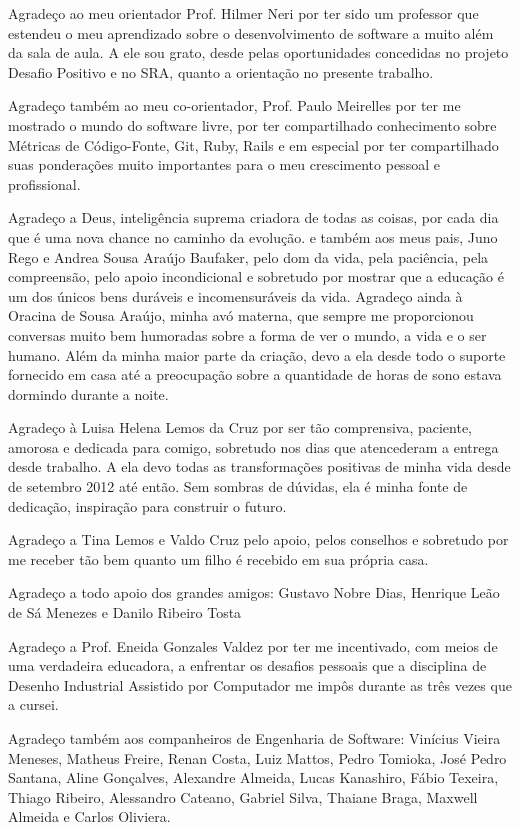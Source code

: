 \begin{agradecimentos}
Agradeço ao meu orientador Prof. Hilmer Neri por ter sido um professor que estendeu o meu aprendizado sobre o desenvolvimento de software a muito além da sala de aula. A ele sou grato, desde pelas oportunidades concedidas no projeto Desafio Positivo e no SRA, quanto a orientação no presente trabalho. 

Agradeço também ao meu co-orientador, Prof. Paulo Meirelles por ter me mostrado o mundo do software livre, por ter compartilhado conhecimento sobre Métricas de Código-Fonte, Git, Ruby, Rails e em especial por ter compartilhado suas ponderações muito importantes para o meu crescimento pessoal e profissional.

Agradeço a Deus, inteligência suprema criadora de todas as coisas, por cada dia que é uma nova chance no caminho da evolução.  e também aos meus pais, Juno Rego e Andrea Sousa Araújo Baufaker, pelo dom da vida, pela paciência, pela compreensão, pelo apoio incondicional e sobretudo por mostrar que a educação é um dos únicos bens duráveis e incomensuráveis da vida. Agradeço ainda à Oracina de Sousa Araújo, minha avó materna, que sempre me proporcionou conversas muito bem humoradas sobre a forma de ver o mundo, a vida e o ser humano. Além da minha maior parte da criação, devo a ela desde todo o suporte fornecido em casa até a preocupação sobre a quantidade de horas de sono estava dormindo durante a noite.

Agradeço à Luisa Helena Lemos da Cruz por ser tão comprensiva, paciente, amorosa e dedicada para comigo, sobretudo nos dias que atencederam a entrega desde trabalho. A ela devo todas as transformações positivas de minha vida desde de setembro 2012 até então. Sem sombras de dúvidas, ela é minha fonte de dedicação, inspiração para construir o futuro. 

Agradeço a Tina Lemos e Valdo Cruz pelo apoio, pelos conselhos e sobretudo por me receber tão bem quanto um filho é recebido em sua própria casa.

Agradeço a todo apoio dos grandes amigos: Gustavo Nobre Dias, Henrique Leão de Sá Menezes e Danilo Ribeiro Tosta


Agradeço a Prof. Eneida Gonzales Valdez por ter me incentivado, com meios de uma verdadeira educadora, a enfrentar os desafios pessoais que a disciplina de Desenho Industrial Assistido por Computador me impôs durante as três vezes que a cursei.

Agradeço também aos companheiros de Engenharia de Software: Vinícius Vieira Meneses, Matheus Freire, Renan Costa, Luiz Mattos, Pedro Tomioka, José Pedro Santana, Aline Gonçalves, Alexandre Almeida, Lucas Kanashiro, Fábio Texeira, Thiago Ribeiro, Alessandro Cateano, Gabriel Silva, Thaiane Braga, Maxwell Almeida e Carlos Oliviera. 

\end{agradecimentos}

